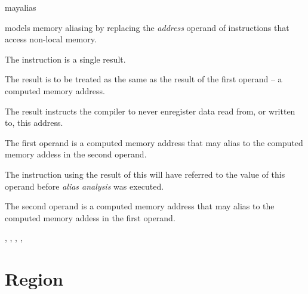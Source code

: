 \begin{instruction}{mayalias}

  \begin{notes}
     models memory aliasing by replacing the
    \emph{address} operand of instructions that access non-local
    memory.
  \end{notes}

  \begin{results}

  \item The instruction is a single result.

    The result is to be treated as the same as the result of the first
    operand -- a computed memory address.

    The result instructs the compiler to never enregister data read
    from, or written to, this address.
  \end{results}

  \begin{operands}
  \item The first operand is a computed memory address that may
    alias to the computed memory addess in the second operand.

    The instruction using the result of this  will
    have referred to the value of this operand before \emph{alias
      analysis} was executed.

  \item The second operand is a computed memory address that may
    alias to the computed memory addess in the first operand.
  \end{operands}

  \begin{seealso}
    ,
    ,
    ,
    ,
  \end{seealso}
\end{instruction}



\section{Region}\label{class:region}

